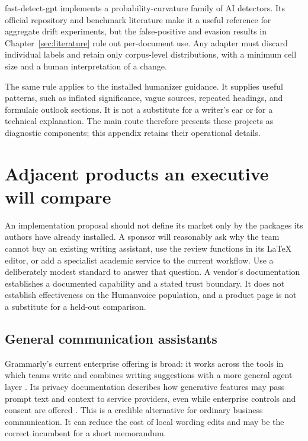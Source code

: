 fast-detect-gpt implements a probability-curvature family of AI detectors. Its
official repository and benchmark literature make it a useful reference for
aggregate drift experiments, but the false-positive and evasion results in
Chapter~\ref{sec:literature} rule out per-document use. Any adapter must
discard individual labels and retain only corpus-level distributions, with a
minimum cell size and a human interpretation of a change.

The same rule applies to the installed humanizer guidance. It supplies useful
patterns, such as inflated significance, vague sources, repeated headings, and
formulaic outlook sections. It is not a substitute for a writer's ear or for a
technical explanation. The main route therefore presents these projects as
diagnostic components; this appendix retains their operational details.

\section{Adjacent products an executive will compare}
\label{sec:software-adjacent}

An implementation proposal should not define its market only by the packages
its authors have already installed. A sponsor will reasonably ask why the team
cannot buy an existing writing assistant, use the review functions in its
LaTeX editor, or add a specialist academic service to the current workflow.
Use a deliberately modest standard to answer that question. A vendor's
documentation establishes a documented capability and a stated trust boundary.
It does not establish effectiveness on the Humanvoice population, and a
product page is not a substitute for a held-out comparison.

\subsection{General communication assistants}

Grammarly's current enterprise offering is broad: it works across the tools in
which teams write and combines writing suggestions with a more general agent
layer \citep{grammarly2026enterprise}. Its privacy documentation describes
how generative features may pass prompt text and context to service providers,
even while enterprise controls and consent are offered
\citep{grammarly2026privacy}. This is a credible alternative for ordinary
business communication. It can reduce the cost of local wording edits and may
be the correct incumbent for a short memorandum.

